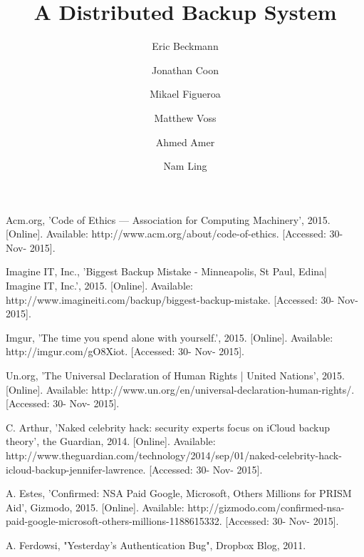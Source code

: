 \documentclass{scu-thesis}
\author{Eric Beckmann}
\author{Jonathan Coon}
\author{Mikael Figueroa}
\author{Matthew Voss}
\title{A Distributed Backup System}
\begin{document}
\frontmatter
\signature{Ahmed Amer}
\signature{Nam Ling}

\maketitle



\tableofcontents
\listoffigures

\mainmatter













%
%

\begin{thebibliography}{9}

Acm.org, 'Code of Ethics            —                Association for Computing Machinery', 2015. [Online]. Available: http://www.acm.org/about/code-of-ethics. [Accessed: 30- Nov- 2015].

Imagine IT, Inc., 'Biggest Backup Mistake - Minneapolis, St Paul, Edina| Imagine IT, Inc.', 2015. [Online]. Available: http://www.imagineiti.com/backup/biggest-backup-mistake. [Accessed: 30- Nov- 2015].

Imgur, 'The time you spend alone with yourself.', 2015. [Online]. Available: http://imgur.com/gO8Xiot. [Accessed: 30- Nov- 2015].

Un.org, 'The Universal Declaration of Human Rights | United Nations', 2015. [Online]. Available: http://www.un.org/en/universal-declaration-human-rights/. [Accessed: 30- Nov- 2015].

C.  Arthur, 'Naked celebrity hack: security experts focus on iCloud backup theory', the Guardian, 2014. [Online]. Available: http://www.theguardian.com/technology/2014/sep/01/naked-celebrity-hack-icloud-backup-jennifer-lawrence. [Accessed: 30- Nov- 2015].

A.  Estes, 'Confirmed: NSA Paid Google, Microsoft, Others Millions for PRISM Aid', Gizmodo, 2015. [Online]. Available: http://gizmodo.com/confirmed-nsa-paid-google-microsoft-others-millions-1188615332. [Accessed: 30- Nov- 2015].

A.  Ferdowsi, "Yesterday's Authentication Bug", Dropbox Blog, 2011.


\end{thebibliography}
\end{document}
